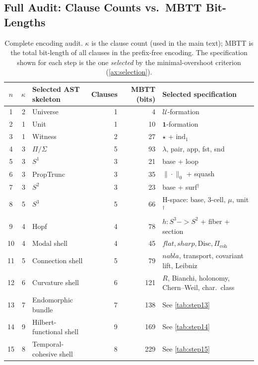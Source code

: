 \documentclass[11pt,a4paper]{article}
\def\to{->}%
\def\nabla{nabla}%
\def\flat{flat}%
\def\sharp{sharp}%
\theoremstyle{plain}
\theoremstyle{definition}
\theoremstyle{remark}
\newcommand{\U}{\mathcal{U}}
\begin{document}
\subsection{Full Audit: Clause Counts vs.\ MBTT Bit-Lengths}

\begin{table}[tbp]
\centering
\caption{Complete encoding audit.  $\kappa$ is the clause count (used in the main text); MBTT is the total bit-length of all clauses in the prefix-free encoding.  The specification shown for each step is the one \emph{selected} by the minimal-overshoot criterion (\cref{ax:selection}).}
\label{tab:mbtt-audit}
\scriptsize
\begin{tabular}{@{}cr lrr >{\raggedright\arraybackslash}p{3.4cm}@{}}
\toprule
$n$ & $\kappa$ & Selected AST skeleton & Clauses & MBTT (bits) & Selected specification \\
\midrule
1  & 2 & Universe           & 1 & 4   & $\U$-formation \\
2  & 1 & Unit               & 1 & 10  & $\mathbf{1}$-formation \\
3  & 1 & Witness            & 2 & 27  & $\star$ + $\mathrm{ind}_1$ \\
4  & 3 & $\Pi/\Sigma$       & 5 & 93  & $\lambda$, pair, app, fst, snd \\
5  & 3 & $S^1$              & 3 & 21  & base + loop \\
6  & 3 & PropTrunc          & 3 & 35  & $\|\cdot\|_0$ + squash \\
7  & 3 & $S^2$              & 3 & 23  & base + surf$^\dagger$ \\
8  & 5 & $S^3$              & 5 & 66  & H-space: base, 3-cell, $\mu$, unit$^\dagger$ \\
9  & 4 & Hopf               & 4 & 78  & $h : S^3 \to S^2$ + fiber + section \\
10 & 4 & Modal shell        & 4 & 45  & $\flat, \sharp, \mathrm{Disc}, \Pi_\mathrm{coh}$ \\
11 & 5 & Connection shell   & 5 & 79  & $\nabla$, transport, covariant lift, Leibniz \\
12 & 6 & Curvature shell    & 6 & 121 & $R$, Bianchi, holonomy, Chern--Weil, char.\ class \\
13 & 7 & Endomorphic bundle & 7 & 138 & See \cref{tab:step13} \\
14 & 9 & Hilbert-functional shell & 9 & 169 & See \cref{tab:step14} \\
15 & 8 & Temporal-cohesive shell & 8 & 229 & See \cref{tab:step15} \\
\bottomrule
\end{tabular}
\end{table}
\end{document}
